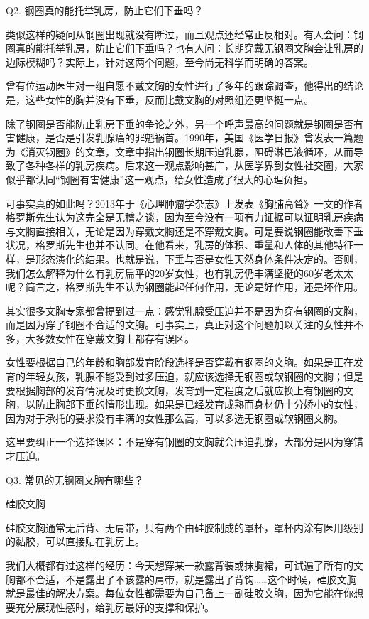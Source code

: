 \documentclass[12pt,UTF8]{ctexbook}
\begin{document}
Q2. 钢圈真的能托举乳房，防止它们下垂吗？


类似这样的疑问从钢圈出现就没有断过，而且观点还经常正反相对。有人会问：钢圈真的能托举乳房，防止它们下垂吗？也有人问：长期穿戴无钢圈文胸会让乳房的边际模糊吗？实际上，针对这两个问题，至今尚无科学而明确的答案。

曾有位运动医生对一组自愿不戴文胸的女性进行了多年的跟踪调查，他得出的结论是，这些女性的胸并没有下垂，反而比戴文胸的对照组还更坚挺一点。


除了钢圈是否能防止乳房下垂的争论之外，另一个呼声最高的问题就是钢圈是否有害健康，是否是引发乳腺癌的罪魁祸首。1990年，美国《医学日报》曾发表一篇题为《消灭钢圈》的文章，文章中指出钢圈长期压迫乳腺，阻碍淋巴液循环，从而导致了各种各样的乳房疾病。后来这一观点影响甚广，从医学界到女性社交圈，大家似乎都认同“钢圈有害健康”这一观点，给女性造成了很大的心理负担。

可事实真的如此吗？2013年于《心理肿瘤学杂志》上发表《胸脯高耸》一文的作者格罗斯先生认为这完全是无稽之谈，因为至今没有一项有力证据可以证明乳房疾病与文胸直接相关，无论是因为穿戴文胸还是不穿戴文胸。可是要说钢圈能改善下垂状况，格罗斯先生也并不认同。在他看来，乳房的体积、重量和人体的其他特征一样，是形态演化的结果。也就是说，下垂与否是女性天然身体条件决定的。否则，我们怎么解释为什么有乳房扁平的20岁女性，也有乳房仍丰满坚挺的60岁老太太呢？简言之，格罗斯先生不认为钢圈能起任何作用，无论是好作用，还是坏作用。

其实很多文胸专家都曾提到过一点：感觉乳腺受压迫并不是因为穿有钢圈的文胸，而是因为穿了钢圈不合适的文胸。可事实上，真正对这个问题加以关注的女性并不多，大多数女性在穿戴文胸上都存有误区。


女性要根据自己的年龄和胸部发育阶段选择是否穿戴有钢圈的文胸。如果是正在发育的年轻女孩，乳腺不能受到过多压迫，就应该选择无钢圈或软钢圈的文胸；但是要根据胸部的发育情况及时更换文胸，发育到一定程度之后就应换上有钢圈的文胸，以防止胸部下垂的情形出现。如果是已经发育成熟而身材仍十分娇小的女性，因为对于承托的要求没有丰满的女性那么高，可以多选无钢圈或软钢圈文胸。

这里要纠正一个选择误区：不是穿有钢圈的文胸就会压迫乳腺，大部分是因为穿错才压迫。





Q3. 常见的无钢圈文胸有哪些？


硅胶文胸

硅胶文胸通常无后背、无肩带，只有两个由硅胶制成的罩杯，罩杯内涂有医用级别的黏胶，可以直接贴在乳房上。

我们大概都有过这样的经历：今天想穿某一款露背装或抹胸裙，可试遍了所有的文胸都不合适，不是露出了不该露的肩带，就是露出了背钩……这个时候，硅胶文胸就是最佳的解决方案。每位女性都需要为自己备上一副硅胶文胸，因为它能在你想要充分展现性感时，给乳房最好的支撑和保护。
\end{document}
